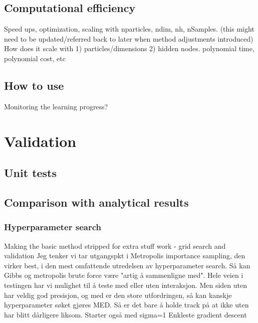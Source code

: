 \documentclass[twoside,english]{uiofysmaster}
\begin{document}
\begin{comment}
\begin{itemize}
	\item In other words: moving only one electron at the time ostensibly halves the required computation cost associated with computing the ratio of the slater determinants.
	This of course comes at the cost of correlation—subsequent samples are less correlated if we simul- taneously move multiple electrons—a complication which we will return to shortly.
	Even after the splitting however, the direct evaluation of our determinants still requires $\mathcal{O}(N^3)$ operations, albeit with a pre-factor 1/8 compared to the original full determinant. It turns out that we can do better.
	\item Only the upper diagonal part of the inter particle distance matrix $r_{ij}$ needs to be filled, since $r_{ij}=r_{ji}$. 
\end{itemize}
\cite{Ledum2017}

\end{comment}



\section{Computational efficiency}
Speed ups, optimization, scaling with nparticles, ndim, nh, nSamples. (this might need to be updated/referred back to later when method adjustments introduced)
How does it scale with 1) particles/dimensions 2) hidden nodes. polynomial time, polynomial cost, etc

\section{How to use}
Monitoring the learning progress?


\chapter{Validation}
\section{Unit tests}

\section{Comparison with analytical results}

\subsection{Hyperparameter search}
Making the basic method stripped for extra stuff work - grid search and validation
Jeg tenker vi tar utgangspkt i Metropolis importance sampling, den virker best, i den mest omfattende utredelsen av hyperparameter search. Så kan Gibbs og metropolis brute force være "artig å sammenligne med". Hele veien i testingen har vi mulighet til å teste med eller uten interaksjon. Men siden uten har veldig god presisjon, og med er den store utfordringen, så kan kanskje hyperparameter søket gjøres MED. Så er det bare å holde track på at ikke uten har blitt dårligere liksom.
Starter også med sigma=1
Enkleste gradient descent
\end{document}
